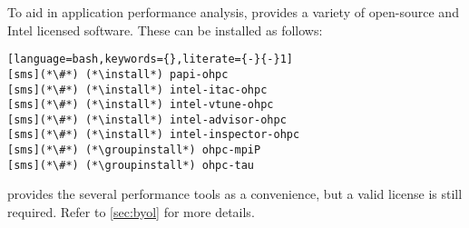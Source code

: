 To aid in application performance analysis, \OHPC{} provides a variety of
open-source and Intel licensed software. These can be installed as follows:

\begin{lstlisting}[language=bash,keywords={},literate={-}{-}1]
[sms](*\#*) (*\install*) papi-ohpc
[sms](*\#*) (*\install*) intel-itac-ohpc
[sms](*\#*) (*\install*) intel-vtune-ohpc
[sms](*\#*) (*\install*) intel-advisor-ohpc
[sms](*\#*) (*\install*) intel-inspector-ohpc
[sms](*\#*) (*\groupinstall*) ohpc-mpiP
[sms](*\#*) (*\groupinstall*) ohpc-tau
\end{lstlisting}

\begin{center}
\begin{tcolorbox}[]
\small
\OHPC{} provides the \IntelR several performance tools as a convenience, but a valid license
is still required. Refer to \ref{sec:byol} for more details.
\end{tcolorbox}
\end{center}

